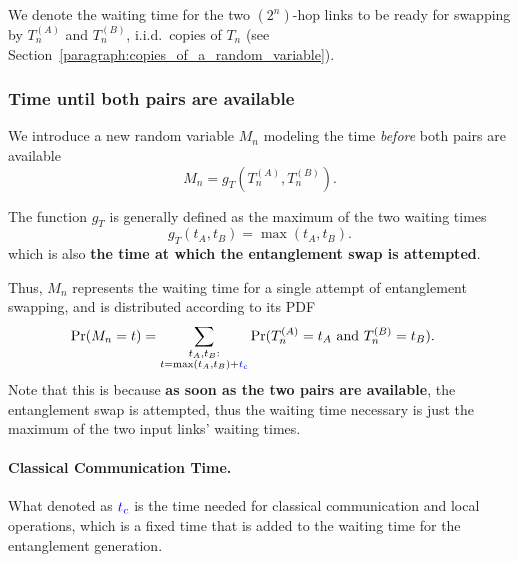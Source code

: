 \documentclass{masterthesis}
\begin{document}
We denote the waiting time for the two $(2^n)$-hop links to be ready for swapping by $T_n^{(A)}$ and $T_n^{(B)}$, i.i.d.\ copies of $T_n$ (see Section~\ref{paragraph:copies_of_a_random_variable}).

\subsubsection*{Time until both pairs are available}

We introduce a new random variable $M_n$ modeling the time \textit{before} both pairs are available
\begin{equation}\label{eq:waiting_time_pair}
    M_n = g_T(T_n^{(A)} , T_n^{(B)}) .
\end{equation}

The function $g_T$ is generally defined as the maximum of the two waiting times
\begin{equation}\label{eq:waiting_time_pair_max}
    g_T(t_A, t_B) = \max(t_A, t_B).
\end{equation}
which is also \textbf{the time at which the entanglement swap is attempted}. 

Thus, $M_n$ represents the waiting time for a single attempt of entanglement swapping, and is distributed according to its PDF
\begin{align}\label{eq:pdf_waiting_time_pair}
    \Pr(M_n = t) &= \sum_{\substack{t_A, t_B: \\ t = \max(t_A, t_B) + \textcolor{blue}{t_c}}} \Pr(T_n^{(A)} = t_A \text{ and } T_n^{(B)} = t_B) .
\end{align}
Note that this is because \textbf{as soon as the two pairs are available}, the entanglement swap is attempted, thus the waiting time necessary is just the maximum of the two input links' waiting times.

\paragraph*{Classical Communication Time.}

What denoted as $\textcolor{blue}{t_c}$ is the time needed for classical communication and local operations, which is a fixed time that is added to the waiting time for the entanglement generation.
\end{document}
